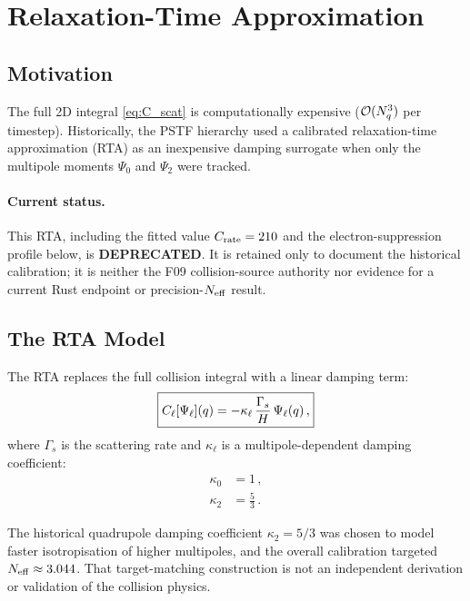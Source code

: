 \section{Relaxation-Time Approximation}\label{sec:rta}

\subsection{Motivation}

The full 2D integral \eqref{eq:C_scat} is computationally expensive ($\mathcal{O}(N_q^3)$ per timestep).  Historically, the PSTF hierarchy used a calibrated relaxation-time approximation (RTA) as an inexpensive damping surrogate when only the multipole moments $\Psi_0$ and $\Psi_2$ were tracked.

\paragraph{Current status.} This RTA, including the fitted value $C_{\rm rate}=210$ and the electron-suppression profile below, is \textbf{DEPRECATED}.  It is retained only to document the historical calibration; it is neither the F09 collision-source authority nor evidence for a current Rust endpoint or precision-$N_{\rm eff}$ result.

\subsection{The RTA Model}

The RTA replaces the full collision integral with a linear damping term:
\begin{equation}
\boxed{C_\ell[\Psi_\ell](q) = -\kappa_\ell\,\frac{\Gamma_s}{H}\,\Psi_\ell(q)\,,}\label{eq:rta}
\end{equation}
where $\Gamma_s$ is the scattering rate and $\kappa_\ell$ is a multipole-dependent damping coefficient:
\begin{align}
\kappa_0 &= 1\,,\\
\kappa_2 &= \frac{5}{3}\,.
\end{align}

The historical quadrupole damping coefficient $\kappa_2 = 5/3$ was chosen to model faster isotropisation of higher multipoles, and the overall calibration targeted $N_{\rm eff}\approx3.044$.  That target-matching construction is not an independent derivation or validation of the collision physics.

